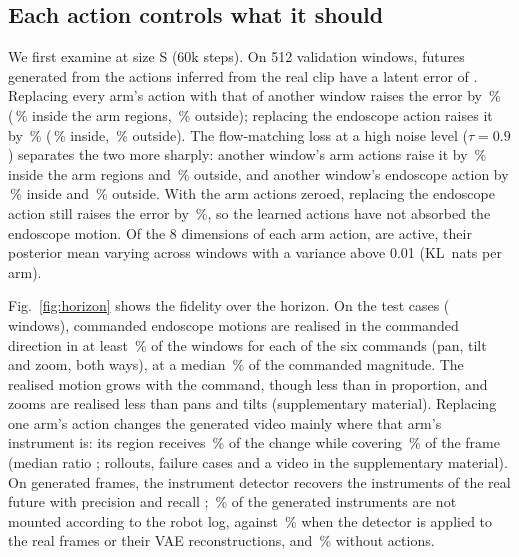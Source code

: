 \subsection{Each action controls what it should}
We first examine \method{} at size S (60k steps). On 512 validation windows, futures generated from the actions inferred from the real clip have a latent error of . Replacing every arm's action with that of another window raises the error by \,\% (\,\% inside the arm regions, \,\% outside); replacing the endoscope action raises it by \,\% (\,\% inside, \,\% outside). The flow-matching loss at a high noise level ($\tau=0.9$) separates the two more sharply: another window's arm actions raise it by \,\% inside the arm regions and \,\% outside, and another window's endoscope action by \,\% inside and \,\% outside. With the arm actions zeroed, replacing the endoscope action still raises the error by \,\%, so the learned actions have not absorbed the endoscope motion. Of the 8 dimensions of each arm action,  are active, their posterior mean varying across windows with a variance above 0.01 (KL \,nats per arm).

Fig.~\ref{fig:horizon} shows the fidelity over the horizon. On the  test cases ( windows), commanded endoscope motions are realised in the commanded direction in at least \,\% of the windows for each of the six commands (pan, tilt and zoom, both ways), at a median \,\% of the commanded magnitude. The realised motion grows with the command, though less than in proportion, and zooms are realised less than pans and tilts (supplementary material). Replacing one arm's action changes the generated video mainly where that arm's instrument is: its region receives \,\% of the change while covering \,\% of the frame (median ratio  ; rollouts, failure cases and a video in the supplementary material). On generated frames, the instrument detector recovers the instruments of the real future with precision  and recall ; \,\% of the generated instruments are not mounted according to the robot log, against \,\% when the detector is applied to the real frames or their VAE reconstructions, and \,\% without actions.

